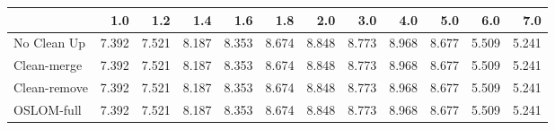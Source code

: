 \begin{tabular}{lrrrrrrrrrrr}
\toprule
{} &   1.0 &   1.2 &   1.4 &   1.6 &   1.8 &   2.0 &   3.0 &   4.0 &   5.0 &   6.0 &   7.0 \\
\midrule
No Clean Up  & 7.392 & 7.521 & 8.187 & 8.353 & 8.674 & 8.848 & 8.773 & 8.968 & 8.677 & 5.509 & 5.241 \\
Clean-merge  & 7.392 & 7.521 & 8.187 & 8.353 & 8.674 & 8.848 & 8.773 & 8.968 & 8.677 & 5.509 & 5.241 \\
Clean-remove & 7.392 & 7.521 & 8.187 & 8.353 & 8.674 & 8.848 & 8.773 & 8.968 & 8.677 & 5.509 & 5.241 \\
OSLOM-full   & 7.392 & 7.521 & 8.187 & 8.353 & 8.674 & 8.848 & 8.773 & 8.968 & 8.677 & 5.509 & 5.241 \\
\bottomrule
\end{tabular}
